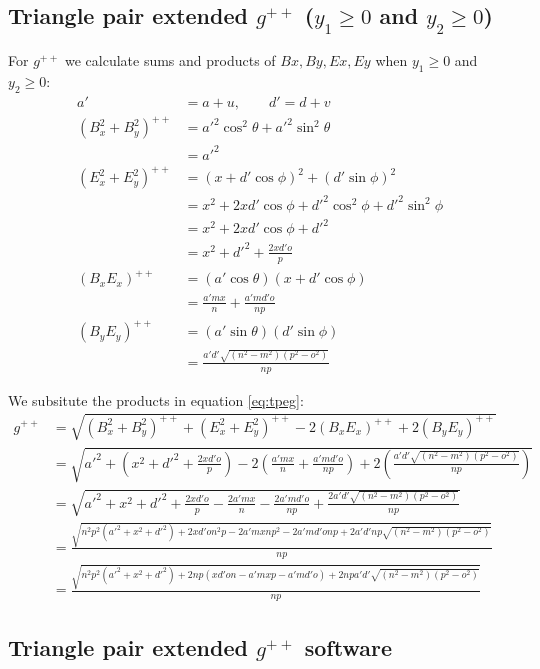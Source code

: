 \documentclass[11pt]{article}
\begin{document}
\subsection{Triangle pair extended $g^{++}$ ($y_1\geq 0$ and $y_2\geq 0$)}

For $g^{++}$ we calculate sums and products of $Bx,By,Ex,Ey$ when $y_1 \geq 0$ and $y_2 \geq 0$:
\begin{align}
a' &= a + u, \qquad d' = d + v\\
(B_x^2 + B_y^2)^{++} &= a'^2\cos^2\theta + a'^2\sin^2\theta \nonumber\\
 &= a'^2\\
(E_x^2 + E_y^2)^{++} &= (x + d'\cos\phi)^2 + (d'\sin\phi)^2 \nonumber\\
 &= x^2 + 2xd'\cos\phi + d'^2\cos^2\phi + d'^2\sin^2\phi \nonumber\\
 &= x^2 + 2xd'\cos\phi + d'^2 \nonumber\\
 &= x^2 + d'^2 + \frac{2xd'o}p\\
(B_xE_x)^{++} &= (a'\cos\theta)(x + d'\cos\phi) \nonumber\\
 &= \frac{a'mx}{n} + \frac{a'md'o}{np}\\
(B_yE_y)^{++} &= (a'\sin\theta)(d'\sin\phi)\nonumber\\
 &= \frac{a'd'\sqrt{(n^2 - m^2)(p^2 - o^2)}}{np}
\end{align}

We subsitute the products in equation \ref{eq:tpeg}:
\begin{align}
g^{++} &= \sqrt{(B_x^2 + B_y^2)^{++} + (E_x^2 + E_y^2)^{++}
 - 2(B_xE_x)^{++} + 2(B_yE_y)^{++}}\nonumber\\
& = \sqrt{
a'^2
+ \left(x^2 + d'^2 + \frac{2xd'o}p\right)
- 2\left(\frac{a'mx}{n} + \frac{a'md'o}{np}\right)
+ 2\left(\frac{a'd'\sqrt{(n^2 - m^2)(p^2 - o^2)}}{np}\right)
}\nonumber\\
%
 &= \sqrt{
a'^2 + x^2 + d'^2 + \frac{2xd'o}p - \frac{2a'mx}n - \frac{2a'md'o}{np}
+ \frac{2a'd'\sqrt{(n^2-m^2)(p^2-o^2)}}{np}
}\nonumber\\
%
 &= \frac{\sqrt{
n^2p^2(a'^2 + x^2 + d'^2) + 2xd'on^2p - 2a'mxnp^2 - 2a'md'onp
+ 2a'd'np\sqrt{(n^2-m^2)(p^2-o^2)}
}}{np} \nonumber\\
%
 &= \frac{\sqrt{
n^2p^2(a'^2 + x^2 + d'^2) + 2np(xd'on - a'mxp - a'md'o) + 2npa'd'\sqrt{(n^2-m^2)(p^2-o^2)}
}}{np}
\end{align}

\subsection{Triangle pair extended $g^{++}$ software}
\end{document}
